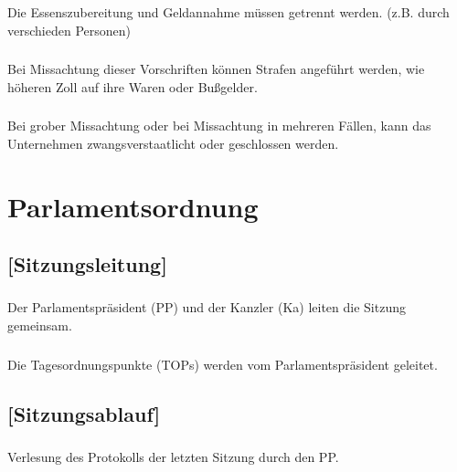 \documentclass[a4paper, 11pt]{report}
\let\oldsubsection\subsection
\renewcommand{\subsection}{\leftskip=40pt\oldsubsection}
\begin{document}
\subsubsection{}
Die Essenszubereitung und Geldannahme müssen getrennt werden. (z.B. durch verschieden Personen) 

\subsubsection{}
Bei Missachtung dieser Vorschriften können Strafen angeführt werden, wie höheren Zoll auf ihre Waren oder Bußgelder.

\subsubsection{}
Bei grober Missachtung oder bei Missachtung in mehreren Fällen, kann das Unternehmen zwangsverstaatlicht oder geschlossen werden. 
    
    
\section{Parlamentsordnung}
    
\subsection{[Sitzungsleitung]}

 
\subsubsection{}
Der Parlamentspräsident (PP) und der Kanzler (Ka) leiten die Sitzung gemeinsam. 

\subsubsection{}
Die Tagesordnungspunkte (TOPs) werden vom Parlamentspräsident geleitet. 

 

\subsection{[Sitzungsablauf]}

 
\subsubsection{}
Verlesung des Protokolls der letzten Sitzung durch den PP. 
\end{document}

